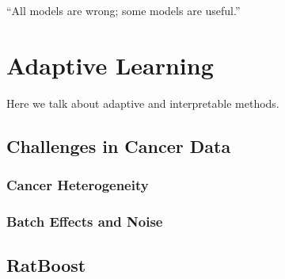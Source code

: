 \begin{savequote}[.5\linewidth]
  ``All models are wrong; some models are useful.''
\end{savequote}

\chapter{Adaptive Learning}

Here we talk about adaptive and interpretable methods.

\section{Challenges in Cancer Data}
\subsection{Cancer Heterogeneity}

\subsection{Batch Effects and Noise}

\section{RatBoost}

